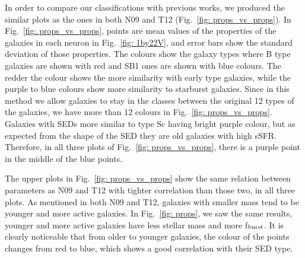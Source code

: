         In order to compare our classifications with previous works, we produced the similar plots as the ones in both N09 and T12 (Fig.~\ref{fig: props_vs_props}).
        In Fig.~\ref{fig: props_vs_props}, points are mean values of the properties of the galaxies in each neuron in Fig.~\ref{fig: 1by22V}, and error bars show the standard deviation of those properties. 
        The colours show the galaxy types where B type galaxies are shown with red and SB1 ones are shown with blue colours.
        The redder the colour shows the more similarity with early type galaxies, while the purple to blue colours show more similarity to starburst galaxies.
        Since in this method we allow galaxies to stay in the classes between the original 12 types of the galaxies, we have more than 12 colours in Fig.~\ref{fig: props_vs_props}.
        Galaxies with SEDs more similar to type Sc having bright purple colour, but as expected from the shape of the SED they are old galaxies with high sSFR.
        Therefore, in all three plots of Fig.~\ref{fig: props_vs_props}, there is a purple point in the middle of the blue points.
        
        The upper plots in Fig.~\ref{fig: props_vs_props} show the same relation between parameters as N09 and T12 with tighter correlation than those two, in all three plots.
        As mentioned in both N09 and T12, galaxies with smaller mass tend to be younger and more active galaxies.
        In Fig.~\ref{fig: props}, we saw the same results, younger and more active galaxies have less stellar mass and more f$_{\rm {burst}}$.
        It is clearly noticeable that from older to younger galaxies, the colour of the points changes from red to blue, which shows a good correlation with their SED type.
        

